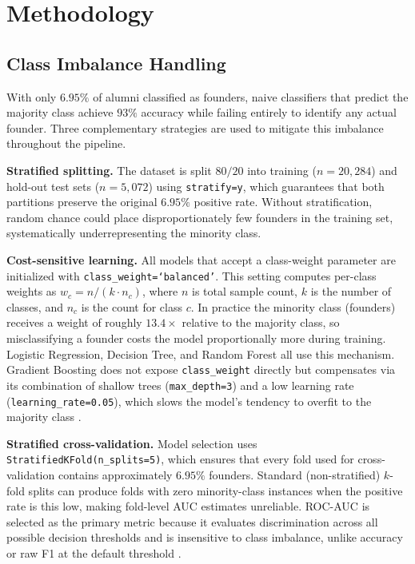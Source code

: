 \documentclass[10pt,twocolumn]{article}
\begin{document}
\section{Methodology}
\label{sec:methods}

\subsection{Class Imbalance Handling}
\label{sec:imbalance}

With only $6.95\%$ of alumni classified as founders, naive classifiers that
predict the majority class achieve $93\%$ accuracy while failing entirely to
identify any actual founder. Three complementary strategies are used to mitigate
this imbalance throughout the pipeline.

\textbf{Stratified splitting.} The dataset is split $80/20$ into training
($n = 20{,}284$) and hold-out test sets ($n = 5{,}072$) using
\texttt{stratify=y}, which guarantees that both partitions preserve the original
$6.95\%$ positive rate. Without stratification, random chance could place
disproportionately few founders in the training set, systematically
underrepresenting the minority class.

\textbf{Cost-sensitive learning.} All models that accept a class-weight
parameter are initialized with \texttt{class\_weight=`balanced'}. This
setting computes per-class weights as $w_c = n / (k \cdot n_c)$, where $n$ is
total sample count, $k$ is the number of classes, and $n_c$ is the count for
class $c$. In practice the minority class (founders) receives a weight of
roughly $13.4\times$ relative to the majority class, so misclassifying a founder
costs the model proportionally more during training. Logistic Regression,
Decision Tree, and Random Forest all use this mechanism. Gradient Boosting does
not expose \texttt{class\_weight} directly but compensates via its combination
of shallow trees (\texttt{max\_depth=3}) and a low learning rate
(\texttt{learning\_rate=0.05}), which slows the model's tendency to overfit to
the majority class \cite{friedman2001}.

\textbf{Stratified cross-validation.} Model selection uses
\texttt{StratifiedKFold(n\_splits=5)}, which ensures that every fold used for
cross-validation contains approximately $6.95\%$ founders. Standard
(non-stratified) $k$-fold splits can produce folds with zero minority-class
instances when the positive rate is this low, making fold-level AUC estimates
unreliable. ROC-AUC is selected as the primary metric because it evaluates
discrimination across all possible decision thresholds and is insensitive to
class imbalance, unlike accuracy or raw F1 at the default threshold
\cite{karimabdallah2025}.
\end{document}
